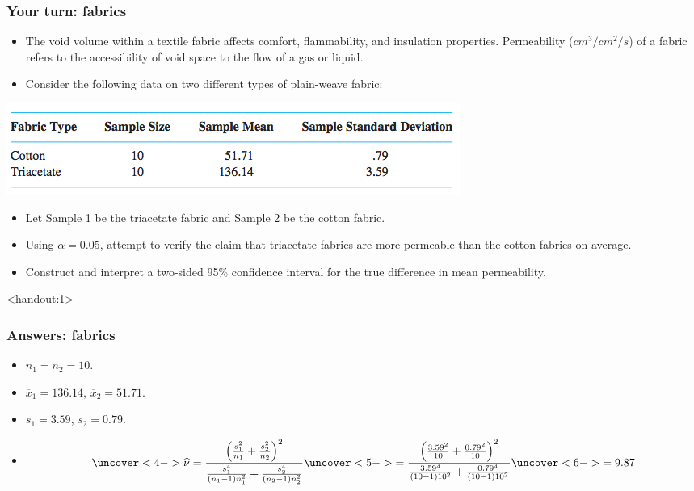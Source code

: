 \documentclass[handout]{beamer}\usepackage[]{graphicx}\usepackage[]{color}
\newcommand{\answers}{1}
\providecommand{\ov}[1]{\overline{#1}}
\providecommand{\wh}[1]{\widehat{#1}}
\numberwithin{equation}{section}
\begin{document}
\begin{frame}
\frametitle{Your turn: fabrics} \scriptsize
\begin{itemize}
\item The void volume within a textile fabric affects comfort, flammability, and insulation properties. Permeability ($cm^3/cm^2/s$) of a fabric refers to the accessibility of void space to the flow of a gas or liquid. 
\pause \item Consider the following data on two different types of plain-weave fabric:
\end{itemize}
 \includegraphics{../../fig/fabricdata.png}
\begin{itemize}
\pause \item Let Sample 1 be the triacetate fabric and Sample 2 be the cotton fabric.
\pause \item Using $\alpha = 0.05$, attempt to verify the claim that triacetate fabrics are more permeable than the cotton fabrics on average.
\pause \item Construct and interpret a two-sided 95\% confidence interval for the true difference in mean permeability.
\end{itemize}
\end{frame}



\begin{frame}<handout:\answers>
\frametitle{Answers: fabrics}
\begin{itemize}
\item $n_1 = n_2 = 10$.
\pause \item $\ov{x}_1 = 136.14$, $\ov{x}_2 = 51.71$.
\pause \item $s_1 = 3.59$, $s_2 = 0.79$.
\item
\begin{align*}
\uncover<4->{\wh{\nu} = \frac{\left (\frac{s_1^2}{n_1} + \frac{s_2^2}{n_2} \right )^2}{\frac{s_1^4}{(n_1 - 1)n_1^2} + \frac{s_2^4}{(n_2 - 1)n_2^2}}} \uncover<5->{ = \frac{\left (\frac{3.59^2}{10} + \frac{0.79^2}{10} \right )^2}{\frac{3.59^4}{(10 - 1)10^2} + \frac{0.79^4}{(10 - 1)10^2}}} \uncover<6->{ = 9.87}
\end{align*}
\end{itemize}
\end{frame}
\end{document}
